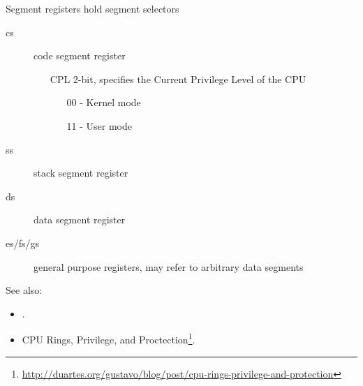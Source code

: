 \begin{frame}
  \begin{iblock}{Segment registers hold segment selectors}
    \begin{description}
    \item[cs] code segment register
      \begin{itemize}
      \item[CPL] 2-bit, specifies the Current Privilege Level of the CPU
        \begin{itemize}
        \item[00] - Kernel mode
        \item[11] - User mode
        \end{itemize}
      \end{itemize}
    \item[ss] stack segment register
    \item[ds] data segment register
    \item[es/fs/gs] general purpose registers, may refer to arbitrary data segments
    \end{description}
  \end{iblock}
\end{frame}

See also:
\begin{itemize}
\item {}.
\item CPU Rings, Privilege, and Proctection\footnote{\url{http://duartes.org/gustavo/blog/post/cpu-rings-privilege-and-protection}}.
\end{itemize}

